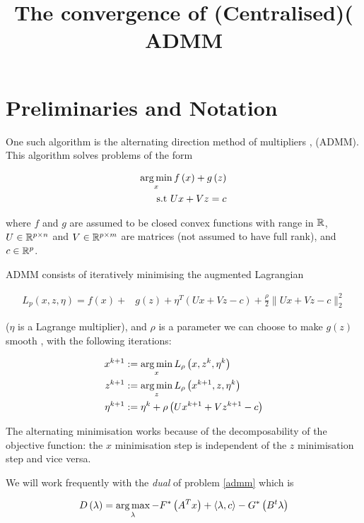 \documentclass{article}
\title{The convergence of (Centralised)( ADMM}
\begin{document}
\section{Preliminaries and Notation}

One such algorithm is the alternating direction method of multipliers \cite{Boyd2010a}, (ADMM). This algorithm solves problems of the form

\begin{align}
\operatorname*{arg\,min}_{x} f\left( x \right) + g\left(z\right) \nonumber
\\
\text{s.t } Ux +Vz = c
\label{admm}
\end{align}

where \(f\) and \(g\) are assumed to be closed convex functions with range in \({\mathbb{R}}\), \(U \in {\mathbb{R}}^{p \times n}\) and \(V\in {\mathbb{R}}^{p \times m}\) are matrices (not assumed to have full rank), and \(c \in {\mathbb{R}}^p\).

ADMM consists of iteratively minimising the augmented Lagrangian 

\begin{align*}
L_p\left(x, z, \eta\right) = f\left( x\right) +& g\left(z\right)+\eta^T\left(Ux+Vz-c\right) + \frac{\rho}{2}\|Ux+Vz-c\|_2^2
\label{admm_form}
\end{align*}

(\(\eta\) is a Lagrange multiplier), and \(\rho\) is a parameter we can choose to make \(g(z)\) smooth \cite{nesterov2005smooth}, with the following iterations:

\begin{align}
x^{k+1} &:= \operatorname*{arg\,min}_{x} L_\rho\left(x,z^k,\eta^k\right)\\
z^{k+1} &:= \operatorname*{arg\,min}_{z} L_\rho\left(x^{k+1},z,\eta^k\right)\\
\eta^{k+1} &:= \eta^{k} + \rho \left(Ux^{k+1} + Vz^{k+1} - c\right)
\label{admm_algo}
\end{align}

The alternating minimisation works because of the decomposability of the objective function: the \(x\) minimisation step is independent of the \(z\) minimisation step and vice versa.  

We will work frequently with the \textit{dual} of problem \eqref{admm} which is

\begin{equation}
D\left(\lambda\right) = \operatorname*{arg\,max}_{\lambda} -F^*\left(A^Tx\right) + \langle \lambda, c \rangle - G^*\left(B^t\lambda\right)
\end{equation}
\end{document}
